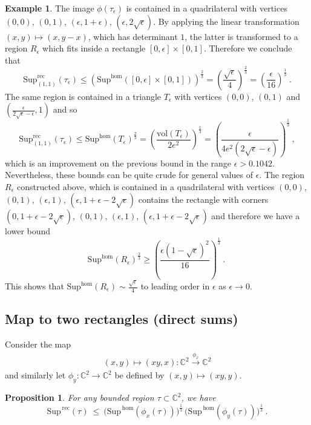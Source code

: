 \documentclass[a4paper,10pt]{amsart}
\newtheorem{prop}[thm]{Proposition}
\theoremstyle{definition}
\newtheorem{example}[thm]{Example}
\theoremstyle{remark}
\numberwithin{equation}{section}
\newcommand{\To}{\longrightarrow}
\newcommand{\C}{\mathbb C}
\newcommand{\rec}{\mathrm{rec}}
\newcommand{\ts}{\mathrm{Sup}}
\newcommand{\0}{\color{blue}{\mathsf{0}}}
\begin{document}
  \begin{example} \label{ex: regiontauepsilonviatensor}  The image $\phi(\tau_{\epsilon})$  is contained in a quadrilateral with vertices $(0,0)$, $(0,1)$, $(\epsilon,1+\epsilon)$, $(\epsilon, 2 \sqrt{\epsilon})$. By applying the linear transformation 
  $(x,y) \mapsto (x, y-x)$, which has determinant $1$,  the latter  is transformed to  a region  $R_{\epsilon}$ which  fits inside a rectangle $[0,\epsilon] \times [0,1]$. Therefore we conclude that 
  \[  \ts^{\rec}_{(1,1)} (\tau_{\epsilon}) \leq \left(\ts^{\hom}(  [0,\epsilon] \times [0,1])\right)^{\frac{2}{3}} =  \left(\frac{\sqrt{\epsilon}}{4}\right)^{\frac{2}{3}} = 
 \left( \frac{\epsilon}{16}\right)^{\frac{1}{3}}
  \ . \]
The same region is  contained in a triangle $T_{\epsilon}$ with vertices $(0,0)$, $(0,1)$ and $(\frac{\epsilon}{2\sqrt{\epsilon}-\epsilon},1)$ and so 
  \[  \ts^{\rec}_{(1,1)} (\tau_{\epsilon}) \leq  \ts^{\hom}(  T_{\epsilon})^{\frac{2}{3}} =  \left( \frac{\mathrm{vol}(T_{\epsilon})}{2 e^2} \right)^{\frac{1}{3}} =\left(  \frac{\epsilon}{ 4 e^2 (2 \sqrt{\epsilon}-\epsilon) }\right)^{\frac{1}{3}}   \ , \]
  which is an improvement  on the previous bound in the range  $\epsilon>0.1042$.
  Nevertheless, these bounds can be quite crude for general values of $\epsilon$.
   The region $R_{\epsilon}$ constructed  above, which is contained in a quadrilateral with vertices $(0,0)$, $(0,1)$, $(\epsilon,1)$, $(\epsilon, 1+\epsilon-2\sqrt{\epsilon})$ contains the rectangle 
  with corners $(0, 1+\epsilon-2\sqrt{\epsilon})$, $(0,1)$, $(\epsilon,1)$,  $(\epsilon, 1+\epsilon-2\sqrt{\epsilon})$ and therefore we have a lower bound
  \[  \ts^{\hom}(R_{\epsilon})^{\frac{2}{3}} \geq   \left(\frac{ \epsilon (1-\sqrt{\epsilon})^2}{16} \right)^{\frac{1}{3}}  \ .   \
 \]
 This shows that  $ \ts^{\hom}(R_{\epsilon})   \sim    \frac{\sqrt{\epsilon}}{4}$ to leading order in $\epsilon$ as $\epsilon\rightarrow 0$.
    \end{example} 
  
  \subsection{Map to two rectangles (direct sums)}
  Consider the map 
  \begin{eqnarray}  (x,y)  \mapsto   ( xy, x ):   \C^2   \overset{\phi_x}{\To}  \C^2 \nonumber 
  \end{eqnarray} 
and similarly let $\phi_y: \C^2 \rightarrow \C^2$ be defined by $(x,y) \mapsto (xy,y )$.

  \begin{prop} For any bounded region $\tau \subset \C^2$, we have 
  \[ \ts^{\, \rec}(\tau)  \ \leq  \  \Big(\ts^{\, \hom} ( \phi_x(\tau) )\Big)^{\frac{1}{3}} \,  \Big(\ts^{\, \hom} ( \phi_y(\tau) )\Big)^{\frac{1}{3}}     \ . \] 
  \end{prop} 
\end{document}
